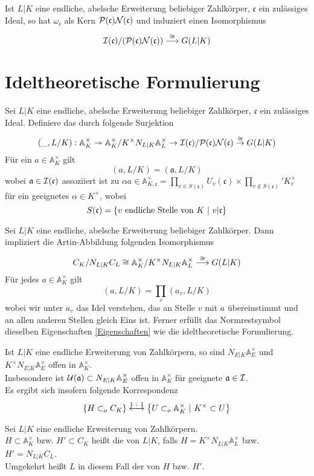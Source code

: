 \documentclass{book}
\renewcommand{\A}{\mathbb{A}}
\newcommand{\Nc}{\mathcal{N}}
\newcommand{\af}{\mathfrak{a}}
\newcommand{\cf}{\mathfrak{c}}
\begin{document}
\Satz{}
Ist $L|K$ eine endliche, abelsche Erweiterung beliebiger Zahlkörper, $\cf$ ein zulässiges Ideal, so hat $\omega_\cf$ als Kern $\P(\cf)\Nc(\cf)$ und induziert einen Isomorphismus
\[ \I(\cf) / (\P(\cf) \Nc(\cf)) \Pfeil{\isom{}} G(L|K) \]

\section{Ideltheoretische Formulierung}
Sei $L|K$ eine endliche, abelsche Erweiterung beliebiger Zahlkörper, $\cf$ ein zulässiges Ideal. Definiere das  durch folgende Surjektion
\[ (\_, L/K) : \A_K^\times \surj{} \A_K^\times / K^\times N_{L|K}\A_L^\times \pfeil{} \I(\cf) /\P(\cf) \Nc(\cf) \pfeil{\isom{}} G(L|K) \]
Für ein $a \in \A_K^\times$ gilt
\[ (a,L/K) = (\af, L/K) \]
wobei $\af \in \I(\cf)$ assoziiert ist zu $\alpha a \in \A_{K,\cf}^\times = \prod_{v\in S(\cf)} U_v(\cf) \times \prod_{v\not \in S(\cf)}'K_v^\times $ für ein geeignetes $\alpha \in K^\times$, wobei
\[ S(\cf) = \set{v\text{ endliche Stelle von }K}{ v |\cf } \]

\Satz{}
Sei $L|K$ eine endliche, abelsche Erweiterung beliebiger Zahlkörper. Dann impliziert die Artin-Abbildung folgenden Isomorphismus
\[ C_K /N_{L|K}C_L \isom{} \A_K^\times / K^\times N_{L|K}\A_L^\times \Pfeil{\isom{}} G(L|K) \]
Für jedes $a \in \A_K^\times$ gilt
\[ (a,L/K) = \prod_v (a_v, L/K) \]
wobei wir unter $a_v$ das Idel verstehen, das an Stelle $v$ mit $a$ übereinstimmt und an allen anderen Stellen gleich Eins ist. Ferner erfüllt das Normrestsymbol dieselben Eigenschaften \ref{Eigenschaften} wie die ideltheoretische Formulierung.

\Bem{}
Ist $L|K$ eine endliche Erweiterung von Zahlkörpern, so sind $N_{E|K}\A_E^\times$ und $K^\times N_{E|K}\A_E^\times$ offen in $\A_K^\times$.\\
Insbesondere ist $\U(\af) \subset N_{E|K}\A_E^\times$ offen in $\A_K^\times$ für geeignete $\af \in \I$.\\
Es ergibt sich insofern folgende Korrespondenz
\[ \set{H \subset_o C_K}{} \overset{\text{1 : 1}}\longleftrightarrow \set{U \subset_o \A_K^\times}{K^\times \subset U} \]

Sei $L|K$ eine endliche Erweiterung von Zahlkörpern.\\
$H \subset \A_K^\times$ bzw. $H' \subset C_K$ heißt die  von $L|K$, falls $H = K^\times N_{L|K}\A_L^\times$ bzw. $H' = N_{L|K}C_L$.\\
Umgekehrt heißt $L$ in diesem Fall der  von $H$ bzw. $H'$.
\end{document}
